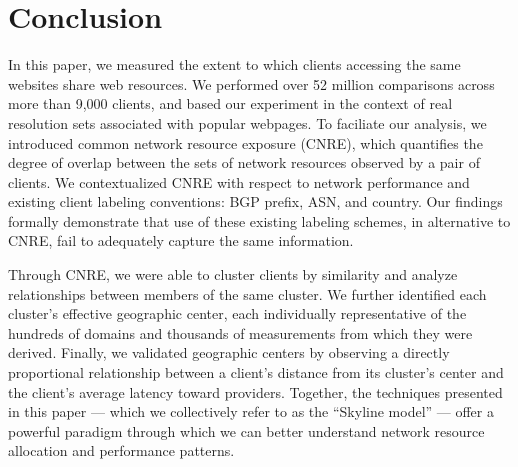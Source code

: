 \section{Conclusion}

In this paper, we
measured the extent to which clients accessing the same websites share web
resources. We performed over 52 million comparisons across more than 9,000
clients, and based our experiment in the context of real resolution sets
associated with popular webpages. To faciliate our analysis, we introduced
common network resource exposure (CNRE), which quantifies the degree of overlap
between the sets of network resources observed by a pair of clients. We
contextualized CNRE with respect to network performance and existing client
labeling conventions: BGP prefix, ASN, and country. Our findings formally
demonstrate that use of these existing labeling schemes, in alternative to CNRE,
fail to adequately capture the same information.

Through CNRE, we were able to cluster clients by similarity and analyze 
relationships between members of the same cluster. We further identified each
cluster's
effective geographic center, each individually representative of the hundreds
of domains and thousands of measurements from which they were derived. Finally,
we validated geographic centers by observing a directly proportional
relationship between a client's distance from its cluster's center and the
client's average latency toward providers. Together,
the techniques presented in this paper --- which we collectively refer to as the
``Skyline model'' --- offer a powerful paradigm through which we can better
understand network resource allocation and performance patterns. 
